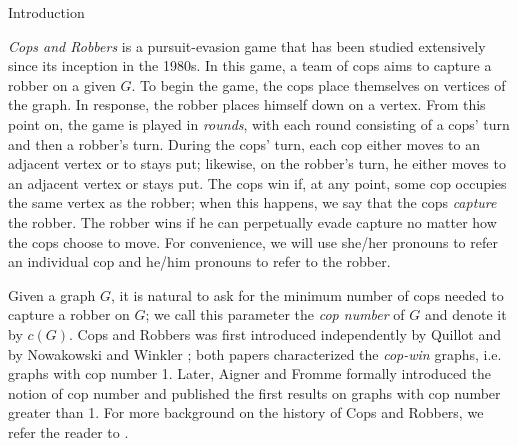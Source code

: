 \documentclass[12pt]{amsart}
\theoremstyle{definition}
\begin{document}
\begin{section}{Introduction}


\textit{Cops and Robbers} is a pursuit-evasion game that has been studied extensively since its inception in the 1980s.  In this game, a team of cops aims to capture a robber on a given $G$.  To begin the game, the cops place themselves on vertices of the graph.  In response, the robber places himself down on a vertex.  From this point on, the game is played in \textit{rounds}, with each round consisting of a cops' turn and then a robber's turn.  During the cops' turn, each cop either moves to an adjacent vertex or to stays put; likewise, on the robber's turn, he either moves to an adjacent vertex or stays put.  The cops win if, at any point, some cop occupies the same vertex as the robber; when this happens, we say that the cops \textit{capture} the robber.  The robber wins if he can perpetually evade capture no matter how the cops choose to move.  For convenience, we will use she/her pronouns to refer an individual cop and he/him pronouns to refer to the robber.

Given a graph $G$, it is natural to ask for the minimum number of cops needed to capture a robber on $G$; we call this parameter the \textit{cop number} of $G$ and denote it by $c(G)$.  Cops and Robbers was first introduced independently by Quillot \cite{Qui78} and by Nowakowski and Winkler \cite{NW83}; both papers characterized the \textit{cop-win} graphs, i.e. graphs with cop number 1.  Later, Aigner and Fromme \cite{AF84} formally introduced the notion of cop number and published the first results on graphs with cop number greater than 1.  For more background on the history of Cops and Robbers, we refer the reader to \cite{BN11}.


\end{section}
\end{document}

